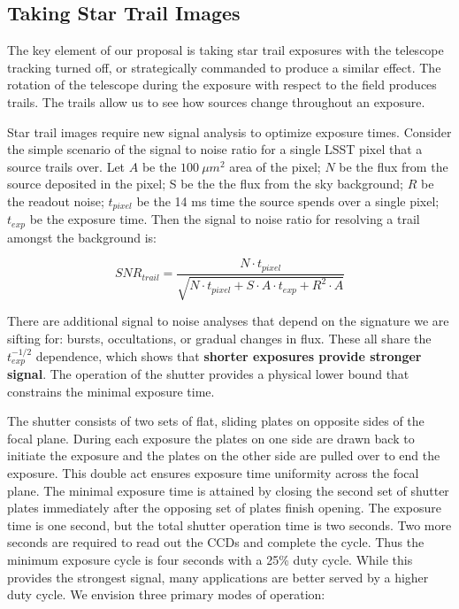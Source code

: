 \documentclass[12pt, letterpaper]{article}
\begin{document}
\subsection{Taking Star Trail Images}
\label{sec:overview}

The key element of our proposal is taking star trail exposures with the telescope tracking turned off, or strategically commanded to produce a similar effect. The rotation of the telescope during the exposure with respect to the field produces trails. The trails allow us to see how sources change throughout an exposure. 

Star trail images require new signal analysis to optimize exposure times. Consider the simple scenario of the signal to noise ratio for a single LSST pixel that a source trails over. Let $A$ be the $100\ \mu m^2$ area of the pixel; $N$ be the flux from the source deposited in the pixel; S be the the flux from the sky background; $R$ be the readout noise; $t_{pixel}$ be the 14 ms time the source spends over a single pixel; $t_{exp}$ be the exposure time. Then the signal to noise ratio for resolving a trail amongst the background is:

$$SNR_{trail} = \frac{N\cdot t_{pixel}}{\sqrt{N\cdot t_{pixel} + S \cdot A \cdot t_{exp} + R^2\cdot A}}$$

\noindent There are additional signal to noise analyses that depend on the signature we are sifting for: bursts, occultations, or gradual changes in flux. These all share the $t_{exp}^{-1/2}$ dependence, which shows that \textbf{shorter exposures provide stronger signal}. The operation of the shutter provides a physical lower bound that constrains the minimal exposure time.

The shutter consists of two sets of flat, sliding plates on opposite sides of the focal plane. During each exposure the plates on one side are drawn back to initiate the exposure and the plates on the other side are pulled over to end the exposure. This double act ensures exposure time uniformity across the focal plane. The minimal exposure time is attained by closing the second set of shutter plates immediately after the opposing set of plates finish opening. The exposure time is one second, but the total shutter operation time is two seconds. Two more seconds are required to read out the CCDs and complete the cycle. Thus the minimum exposure cycle is four seconds with a 25\% duty cycle. While this provides the strongest signal, many applications are better served by a higher duty cycle. We envision three primary modes of operation:
\end{document}

